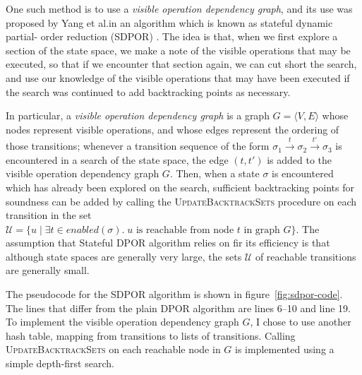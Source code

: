 \documentclass[12pt,a4paper,twoside,openright]{report}
\begin{document}
One such method is to use a \emph{visible operation dependency
graph}, and its use was proposed by Yang et al.\@ in an
algorithm which is known as stateful dynamic partial-
order reduction (SDPOR) \cite{yang08}. The idea is that, when we first explore
a section of the state space,
we make a note of the visible operations
that may be executed, so that if we encounter that section again,
we can cut short the search, and use our knowledge of the
visible operations that may have been
executed if the search was continued
to add backtracking points as necessary.

In particular, a \emph{visible operation dependency
graph} is a graph $G = \langle V, E \rangle$ whose
nodes represent visible operations, and whose edges
represent the ordering of those transitions; whenever
a transition sequence of the form
$\sigma_1 \xrightarrow{t} \sigma_2 \xrightarrow{t'}
 \sigma_3$
is encountered in a search of the state space, the
edge $(t, t')$ is added to the visible operation
dependency graph $G$. Then, when a state $\sigma$ is
encountered which has already been explored on the
search, sufficient backtracking points for soundness
can be added by calling the
\textsc{UpdateBacktrackSets} procedure
on each transition in the set
$\mathcal{U} = \{u \mid \exists t \in \textit{enabled}(\sigma).\;
   u \text{ is reachable from node } t \text{ in graph } G\}$.
The assumption that Stateful DPOR algorithm 
relies on fir its efficiency is that
although state spaces are generally very large,
the sets $\mathcal{U}$ of reachable transitions
are generally small.

The pseudocode for the SDPOR algorithm is shown
in figure~\ref{fig:sdpor-code}. The lines that
differ from the plain DPOR algorithm are lines
6--10 and line 19.
To implement the visible operation dependency graph
$G$, I chose to use another hash table,
mapping from transitions to lists of transitions.
Calling \textsc{UpdateBacktrackSets} on
each reachable node in $G$ is implemented using
a simple depth-first search.
\end{document}
